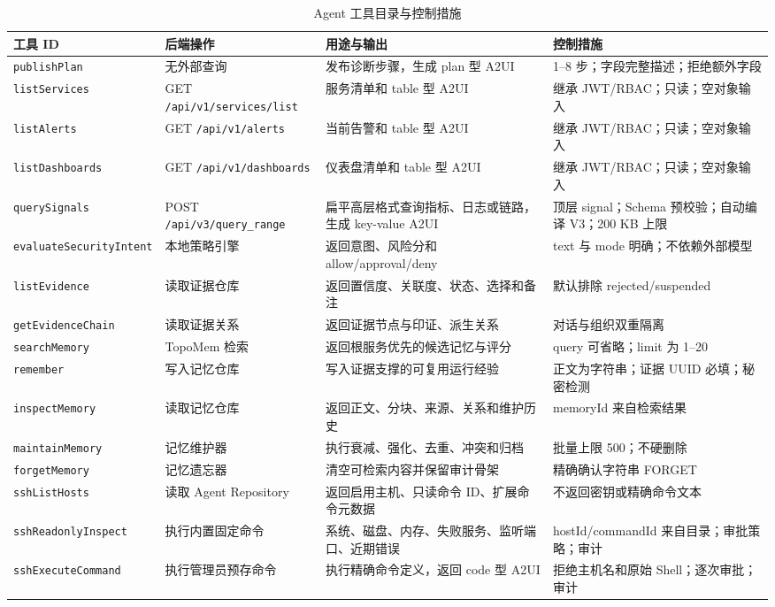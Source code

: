 \documentclass[conference,10pt]{IEEEtran}
\newcommand{\code}[1]{\texttt{#1}}
\begin{document}
\begin{table}[t]
\caption{Agent 工具目录与控制措施}
\label{tab:tools}
\centering
\small
\begin{tabularx}{\textwidth}{p{2.5cm}p{2.7cm}Y p{2.5cm}}
\toprule
\textbf{工具 ID} & \textbf{后端操作} & \textbf{用途与输出} & \textbf{控制措施} \\
\midrule
\code{publishPlan} & 无外部查询 & 发布诊断步骤，生成 plan 型 A2UI & 1--8 步；字段完整描述；拒绝额外字段 \\
\code{listServices} & GET \code{/api/v1/services/list} & 服务清单和 table 型 A2UI & 继承 JWT/RBAC；只读；空对象输入 \\
\code{listAlerts} & GET \code{/api/v1/alerts} & 当前告警和 table 型 A2UI & 继承 JWT/RBAC；只读；空对象输入 \\
\code{listDashboards} & GET \code{/api/v1/dashboards} & 仪表盘清单和 table 型 A2UI & 继承 JWT/RBAC；只读；空对象输入 \\
\code{querySignals} & POST \code{/api/v3/query\_range} & 扁平高层格式查询指标、日志或链路，生成 key-value A2UI & 顶层 signal；Schema 预校验；自动编译 V3；200 KB 上限 \\
\code{evaluateSecurity}\newline\code{Intent} & 本地策略引擎 & 返回意图、风险分和 allow/approval/deny & text 与 mode 明确；不依赖外部模型 \\
\code{listEvidence} & 读取证据仓库 & 返回置信度、关联度、状态、选择和备注 & 默认排除 rejected/suspended \\
\code{getEvidenceChain} & 读取证据关系 & 返回证据节点与印证、派生关系 & 对话与组织双重隔离 \\
\code{searchMemory} & TopoMem 检索 & 返回根服务优先的候选记忆与评分 & query 可省略；limit 为 1--20 \\
\code{remember} & 写入记忆仓库 & 写入证据支撑的可复用运行经验 & 正文为字符串；证据 UUID 必填；秘密检测 \\
\code{inspectMemory} & 读取记忆仓库 & 返回正文、分块、来源、关系和维护历史 & memoryId 来自检索结果 \\
\code{maintainMemory} & 记忆维护器 & 执行衰减、强化、去重、冲突和归档 & 批量上限 500；不硬删除 \\
\code{forgetMemory} & 记忆遗忘器 & 清空可检索内容并保留审计骨架 & 精确确认字符串 FORGET \\
\code{sshListHosts} & 读取 Agent Repository & 返回启用主机、只读命令 ID、扩展命令元数据 & 不返回密钥或精确命令文本 \\
\code{sshReadonly}\newline\code{Inspect} & 执行内置固定命令 & 系统、磁盘、内存、失败服务、监听端口、近期错误 & hostId/commandId 来自目录；审批策略；审计 \\
\code{sshExecute}\newline\code{Command} & 执行管理员预存命令 & 执行精确命令定义，返回 code 型 A2UI & 拒绝主机名和原始 Shell；逐次审批；审计 \\
\bottomrule
\end{tabularx}
\end{table}
\end{document}
